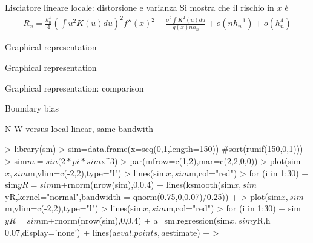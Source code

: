 \documentclass{beamer}
\begin{document}
\begin{frame}{Lisciatore lineare locale: distorsione e varianza}
Si mostra che il rischio in $x$ \`e
\begin{eqnarray*}
R_x = \frac{h_n^4}{4}\left( \int u^2K(u)du\right)^2 f''(x)^2 + \frac{\sigma^2\int K^2(u)du}{g(x)nh_n} +o(nh_n^{-1}) +o(h_n^4)
\end{eqnarray*}

\end{frame}



\begin{frame}{Graphical representation}
\end{frame}

\begin{frame}{Graphical representation}
\end{frame}

\begin{frame}{Graphical representation: comparison}
\end{frame}




\begin{frame}{Boundary bias}

N-W versus local linear, same bandwith
\begin{center}
\begin{Schunk}
\begin{Sinput}
> library(sm)
> sim=data.frame(x=seq(0,1,length=150)) #sort(runif(150,0,1)))
> sim$m=sin(2*pi*sim$x^3)
> par(mfrow=c(1,2),mar=c(2,2,0,0))
> plot(sim$x,sim$m,ylim=c(-2,2),type="l")
> lines(sim$x,sim$m,col="red")
> for (i in 1:30){
+   sim$yR=sim$m+rnorm(nrow(sim),0,0.4)
+   lines(ksmooth(sim$x,sim$yR,kernel="normal",bandwidth = qnorm(0.75,0,0.07)/0.25))
+ }
> plot(sim$x,sim$m,ylim=c(-2,2),type="l")
> lines(sim$x,sim$m,col="red")
> for (i in 1:30){
+   sim$yR=sim$m+rnorm(nrow(sim),0,0.4)
+   a=sm.regression(sim$x,sim$yR,h = 0.07,display='none')
+   lines(a$eval.points,a$estimate)
+ }
> 
\end{Sinput}
\end{Schunk}
\end{center}

\end{frame}
\end{document}
